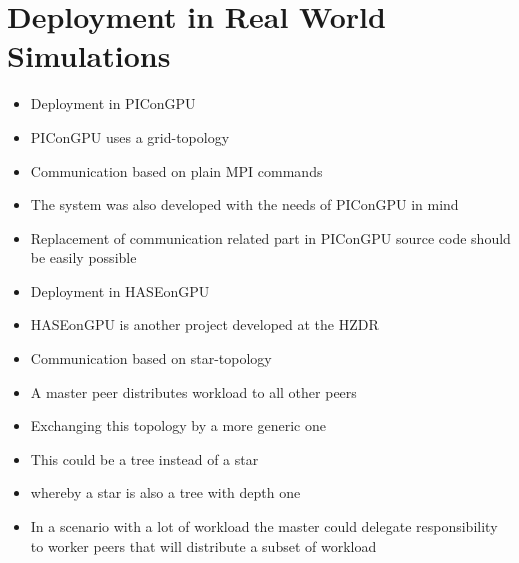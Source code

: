 \section*{Deployment in Real World Simulations}
\begin{itemize}

\item Deployment in PIConGPU
\item PIConGPU uses a grid-topology
\item Communication based on plain MPI commands
\item The system was also developed with the needs
  of PIConGPU in mind
\item Replacement of communication related part
  in PIConGPU source code should be easily possible

\item Deployment in HASEonGPU
\item HASEonGPU is another project developed at the HZDR
\item Communication based on star-topology
\item A master peer distributes workload to all other peers
\item Exchanging this topology by a more generic one
\item This could be a tree instead of a star
\item whereby a star is also a tree with depth one
\item In a scenario with a lot of workload the master
  could delegate responsibility to worker peers that
  will distribute a subset of workload
\end{itemize}

